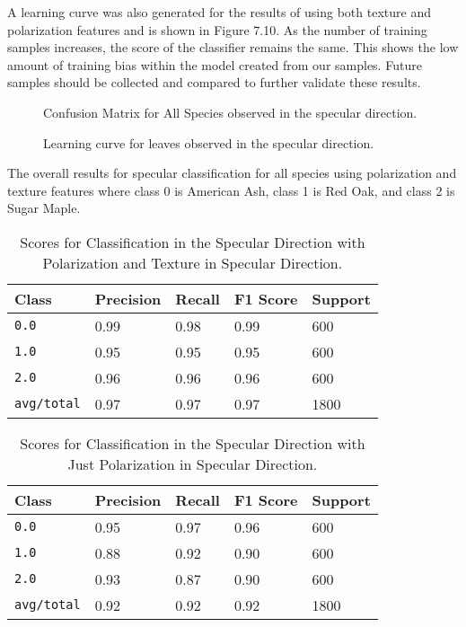 A learning curve was also generated for the results of using both texture and polarization features and is shown in Figure 7.10.  As the number of training samples increases, the score of the classifier remains the same.  This shows the low amount of training bias within the model created from our samples. Future samples should be collected and compared to further validate these results.
%
\begin{figure}[!htb]
    \begin{center}
    \end{center}
    \caption{Confusion Matrix for All Species observed in the specular direction.}
    \label{fig:polarization}
\end{figure}
%
%
\begin{figure}[!htb]
    \begin{center}
    \end{center}
    \caption{Learning curve for leaves observed in the specular direction.}
    \label{fig:polarization}
\end{figure}
%
The overall results for specular classification for all species using polarization and texture features where class 0 is American Ash, class 1 is Red Oak, and class 2 is Sugar Maple.
%
\begin{table}[htb]
  \centering
  \begin{tabular}{lllll}
    \toprule
    \textbf{Class} & \textbf{Precision} & \textbf{Recall} & \textbf{F1 Score} & \textbf{Support} \\
    \midrule
      \texttt{0.0} & 0.99 & 0.98 & 0.99 & 600 \\
      \texttt{1.0} & 0.95 & 0.95 & 0.95 & 600 \\
      \texttt{2.0} & 0.96 & 0.96 & 0.96 & 600 \\
      \texttt{avg/total} & 0.97 & 0.97 & 0.97 & 1800 \\
    \bottomrule
  \end{tabular}
  \caption{%
    Scores for Classification in the Specular Direction with Polarization and Texture in Specular Direction.
  }
  \label{tab:Packages}
\end{table}
\begin{table}[htb]
  \centering
  \begin{tabular}{lllll}
    \toprule
    \textbf{Class} & \textbf{Precision} & \textbf{Recall} & \textbf{F1 Score} & Support\\
    \midrule
      \texttt{0.0} & 0.95 & 0.97 & 0.96 & 600 \\
      \texttt{1.0} & 0.88 & 0.92 & 0.90 & 600 \\
      \texttt{2.0} & 0.93 & 0.87 & 0.90 & 600 \\
      \texttt{avg/total} & 0.92 & 0.92 & 0.92 & 1800 \\
    \bottomrule
  \end{tabular}
  \caption{%
    Scores for Classification in the Specular Direction with Just Polarization in Specular Direction.
  }
  \label{tab:Packages}
\end{table}

